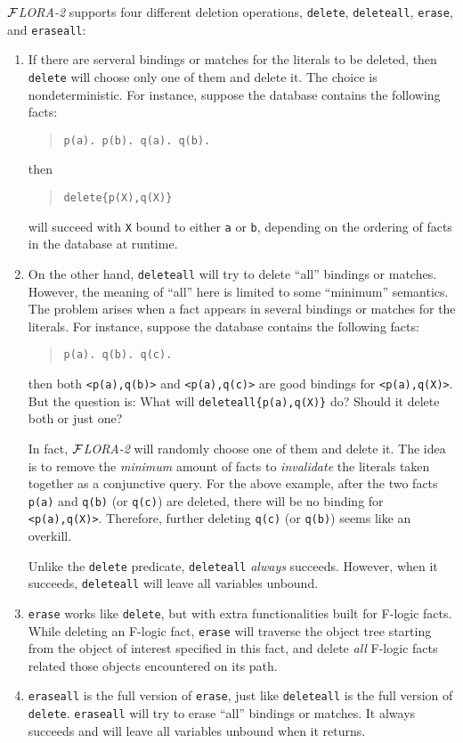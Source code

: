 \documentclass[11pt]{article}
\newcommand{\FLORA}{{\mbox{${\cal F}${\small\it LORA}\rm\emph{-2}}}\xspace}
\newcommand{\fl}{\mbox{F-logic}\xspace}
\begin{document}
\FLORA supports four different deletion operations, {\tt delete},
{\tt deleteall}, {\tt erase}, and {\tt eraseall}:
\begin{enumerate}
\item If there are serveral bindings or matches for
      the literals to be deleted, then {\tt delete} will choose only
      one of them and delete it. The choice is nondeterministic.
      For instance, suppose the database contains the following facts:
      \begin{quote}
      \verb|p(a). p(b). q(a). q(b).|
      \end{quote}
      then
      \begin{quote}
      \verb|delete{p(X),q(X)}|
      \end{quote}
      will succeed with {\tt X} bound to either {\tt a} or {\tt b},
      depending on the ordering of facts in the database at runtime.

\item On the other hand, {\tt deleteall} will try to delete ``all''
      bindings or matches. However, the meaning of ``all'' here is
      limited to some ``minimum'' semantics. The problem arises when
      a fact appears in several bindings or matches for the literals.
      For instance, suppose the database contains the following facts:
      \begin{quote}
      \verb|p(a). q(b). q(c).|
      \end{quote}
      then both \verb|<p(a),q(b)>| and \verb|<p(a),q(c)>| are good
      bindings for \verb|<p(a),q(X)>|. But the question is: What will
      \verb|deleteall{p(a),q(X)}| do? Should it delete both or just one?

      \smallskip

      In fact, \FLORA will randomly choose one of them and delete it.
      The idea is to remove the \emph{minimum} amount of facts to
      \emph{invalidate} the literals taken together as a conjunctive
      query. For the above example, after the two facts {\tt p(a)} and
      {\tt q(b)} (or {\tt q(c)}) are deleted, there will be no binding for
      \verb|<p(a),q(X)>|. Therefore, further deleting {\tt q(c)}
      (or {\tt q(b)}) seems like an overkill.

      \smallskip

      Unlike the {\tt delete} predicate, {\tt deleteall} \emph{always}
      succeeds. However, when it succeeds, {\tt deleteall} will leave
      all variables unbound.

\item {\tt erase} works like {\tt delete}, but with extra functionalities
      built for \fl facts. While deleting an \fl fact, {\tt erase}
      will traverse the object tree starting from the object of
      interest specified in this fact, and delete \emph{all} \fl facts
      related those objects encountered on its path.

\item {\tt eraseall} is the full version of {\tt erase}, just like {\tt deleteall}
      is the full version of {\tt delete}. {\tt eraseall} will try to erase
      ``all'' bindings or matches. It always succeeds and will leave all
      variables unbound when it returns.
\end{enumerate}
\end{document}
